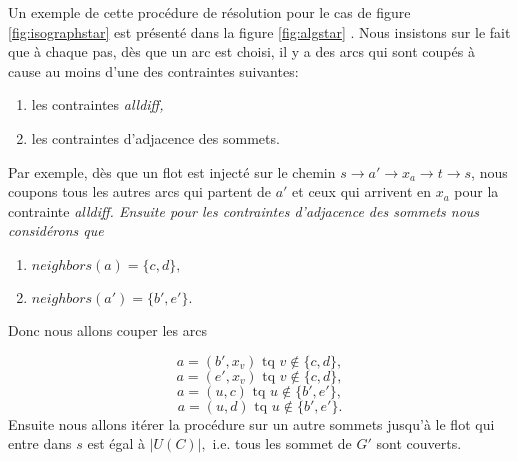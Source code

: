 \documentclass[french]{article}
\theoremstyle{definition}
\theoremstyle{remark}
\begin{document}
Un exemple de cette procédure de résolution pour le cas de figure \ref{fig:isographstar} est présenté dans la figure \ref{fig:algstar} . Nous insistons sur le fait que à chaque pas, dès que un arc est choisi, il y a des arcs qui sont coupés à cause au moins d'une des contraintes suivantes:
\begin{enumerate}
	\item les contraintes \it alldiff, \rm
	\item les contraintes d'adjacence des sommets.
\end{enumerate}
Par exemple, dès que un flot est injecté sur le chemin $s \rightarrow a' \rightarrow x_a \rightarrow t \rightarrow s$, nous coupons tous les autres arcs qui partent de $a'$ et ceux qui arrivent en $x_a$ pour la contrainte \it alldiff. \rm Ensuite pour les contraintes d'adjacence des sommets nous considérons que
\begin{enumerate}
	\item $neighbors(a)=\{c, d\},$
	\item $neighbors(a')=\{b', e'\}.$
\end{enumerate}
Donc nous allons couper les arcs

$$ a=(b', x_v) \text{ tq } v \notin \{c,d\} , $$
$$ a=(e', x_v) \text{ tq } v \notin \{c,d\}, $$
$$ a=(u, c) \text{ tq } u \notin \{b',e'\}, $$
$$ a=(u, d) \text{ tq } u \notin \{b',e'\}. $$
Ensuite nous allons itérer la procédure sur un autre sommets jusqu'à le flot qui entre dans $s$ est égal à $|U(C)|,$ i.e. tous les sommet de $G'$ sont couverts. 
\end{document}
